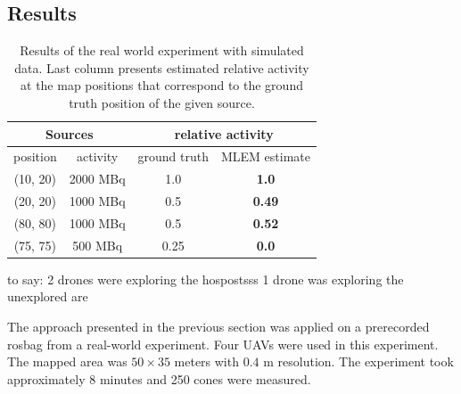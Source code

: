 \subsection{Results}
\begin{table}[htb]
\begin{center}
  \begin{tabular}{ |c|c|c|c| } 
 \hline
    \multicolumn{2}{|c}{Sources} &  \multicolumn{2}{|c|}{ relative activity } \\
 \hline
    position & activity & ground truth & MLEM estimate\\ 
 \hline
    (10, 20) & 2000 MBq & 1.0  & \textbf{1.0} \\ 
    (20, 20) & 1000 MBq &  0.5 & \textbf{0.49} \\ 
    (80, 80) & 1000 MBq &  0.5 & \textbf{0.52} \\ 
    (75, 75) & 500 MBq &  0.25 & \textbf{0.0} \\ 
 \hline
\end{tabular}
  \caption{Results of the real world experiment with simulated data. Last column presents estimated relative activity at the map positions that correspond to the ground truth position of the given source.}
  \label{tab:temenight_results}
\end{center}
\end{table}


to say:
2 drones were exploring the hospostsss
1 drone was exploring the unexplored are






The approach presented in the previous section was applied on a prerecorded rosbag from a real-world experiment.
Four \ac{UAV}s were used in this experiment.
The mapped area was $50 \times 35$ meters with $0.4$ m resolution.
The experiment took approximately 8 minutes and 250 cones were measured.

